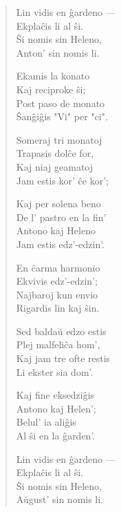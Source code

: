\begin{verse}
                        Lin vidis en \^gardeno ---\\
                        Ekpla\^cis li al \^si.\\
                        \^Si nomis sin Heleno,\\
                        Anton' sin nomis li.

                        Ekamis la konato\\
                        Kaj reciproke \^si;\\
                        Post paso de monato\\
                        \^San\^gi\^gis "Vi" per "ci".

                        Someraj tri monatoj\\
                        Trapasis dol\^ce for,\\
                        Kaj niaj geamatoj\\
                        Jam estis kor' \^ce kor';

                        Kaj per solena beno\\
                        De l' pastro en la fin'\\
                        Antono kaj Heleno\\
                        Jam estis edz'-edzin'.

                        En \^carma harmonio\\
                        Ekvivis edz'-edzin';\\
                        Najbaroj kun envio\\
                        Rigardis lin kaj \^sin.

                        Sed balda\u u edzo estis\\
                        Plej malfeli\^ca hom',\\
                        Kaj jam tre ofte restis\\
                        Li ekster sia dom'.

                        Kaj fine eksedzi\^gis\\
                        Antono kaj Helen';\\
                        Belul' ia ali\^gis\\
                        Al \^si en la \^garden'.

                        Lin vidis en \^gardeno ---\\
                        Ekpla\^cis li al \^si.\\
                        \^Si nomis sin Heleno,\\
                        A\u ugust' sin nomis li.


\end{verse}
